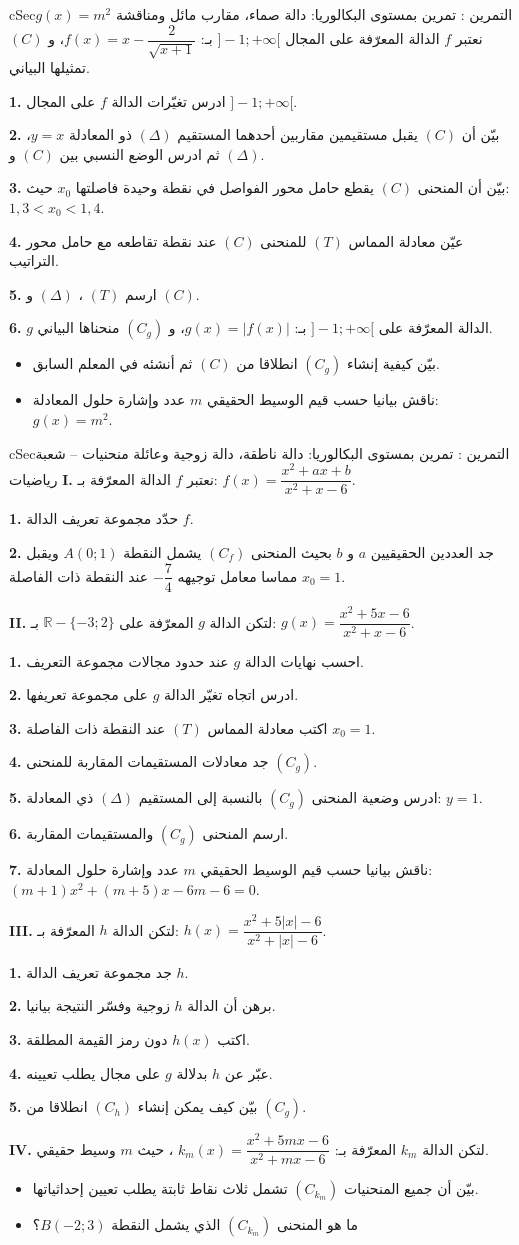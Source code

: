 \documentclass[12pt,a4paper]{article}
\newenvironment{BOX}[2]{\begin{otherlanguage}{english}\begin{arbox}{#1}{#2}}{\end{arbox}\end{otherlanguage}}
\newcounter{exo}
\newenvironment{tamrin}[1]{\stepcounter{exo}\begin{BOX}{cSec}{التمرين \theexo: #1}}{\end{BOX}}
\newcommand{\R}{\mathbb{R}}
\newcommand{\QQ}[1]{\par\smallskip\textbf{#1.} }
\begin{document}
\begin{tamrin}{تمرين بمستوى البكالوريا: دالة صماء، مقارب مائل ومناقشة $g(x)=m^{2}$}
نعتبر $f$ الدالة المعرّفة على المجال $]-1;+\infty[$ بـ: $f(x)=x-\dfrac{2}{\sqrt{x+1}}$، و $(C)$ تمثيلها البياني.
\QQ{1} ادرس تغيّرات الدالة $f$ على المجال $]-1;+\infty[$.
\QQ{2} بيّن أن $(C)$ يقبل مستقيمين مقاربين أحدهما المستقيم $(\Delta)$ ذو المعادلة $y=x$، ثم ادرس الوضع النسبي بين $(C)$ و $(\Delta)$.
\QQ{3} بيّن أن المنحنى $(C)$ يقطع حامل محور الفواصل في نقطة وحيدة فاصلتها $x_0$ حيث: $1{,}3<x_0<1{,}4$.
\QQ{4} عيّن معادلة المماس $(T)$ للمنحنى $(C)$ عند نقطة تقاطعه مع حامل محور التراتيب.
\QQ{5} ارسم $(T)$ ، $(\Delta)$ و $(C)$.
\QQ{6} $g$ الدالة المعرّفة على $]-1;+\infty[$ بـ: $g(x)=|f(x)|$، و $(C_g)$ منحناها البياني.
\begin{itemize}[label=$\star$]
\item بيّن كيفية إنشاء $(C_g)$ انطلاقا من $(C)$ ثم أنشئه في المعلم السابق.
\item ناقش بيانيا حسب قيم الوسيط الحقيقي $m$ عدد وإشارة حلول المعادلة: $g(x)=m^{2}$.
\end{itemize}
\end{tamrin}

\begin{tamrin}{تمرين بمستوى البكالوريا: دالة ناطقة، دالة زوجية وعائلة منحنيات -- شعبة رياضيات}
\textbf{I.} نعتبر $f$ الدالة المعرّفة بـ: $f(x)=\dfrac{x^{2}+ax+b}{x^{2}+x-6}$.
\QQ{1} حدّد مجموعة تعريف الدالة $f$.
\QQ{2} جد العددين الحقيقيين $a$ و $b$ بحيث المنحنى $(C_f)$ يشمل النقطة $A(0;1)$ ويقبل مماسا معامل توجيهه $-\dfrac74$ عند النقطة ذات الفاصلة $x_0=1$.

\textbf{II.} لتكن الدالة $g$ المعرّفة على $\R-\{-3;2\}$ بـ: $g(x)=\dfrac{x^{2}+5x-6}{x^{2}+x-6}$.
\QQ{1} احسب نهايات الدالة $g$ عند حدود مجالات مجموعة التعريف.
\QQ{2} ادرس اتجاه تغيّر الدالة $g$ على مجموعة تعريفها.
\QQ{3} اكتب معادلة المماس $(T)$ عند النقطة ذات الفاصلة $x_0=1$.
\QQ{4} جد معادلات المستقيمات المقاربة للمنحنى $(C_g)$.
\QQ{5} ادرس وضعية المنحنى $(C_g)$ بالنسبة إلى المستقيم $(\Delta)$ ذي المعادلة: $y=1$.
\QQ{6} ارسم المنحنى $(C_g)$ والمستقيمات المقاربة.
\QQ{7} ناقش بيانيا حسب قيم الوسيط الحقيقي $m$ عدد وإشارة حلول المعادلة: \ $(m+1)x^{2}+(m+5)x-6m-6=0$.

\textbf{III.} لتكن الدالة $h$ المعرّفة بـ: $h(x)=\dfrac{x^{2}+5|x|-6}{x^{2}+|x|-6}$.
\QQ{1} جد مجموعة تعريف الدالة $h$.
\QQ{2} برهن أن الدالة $h$ زوجية وفسّر النتيجة بيانيا.
\QQ{3} اكتب $h(x)$ دون رمز القيمة المطلقة.
\QQ{4} عبّر عن $h$ بدلالة $g$ على مجال يطلب تعيينه.
\QQ{5} بيّن كيف يمكن إنشاء $(C_h)$ انطلاقا من $(C_g)$.

\textbf{IV.} لتكن الدالة $k_m$ المعرّفة بـ: $k_m(x)=\dfrac{x^{2}+5mx-6}{x^{2}+mx-6}$ ، حيث $m$ وسيط حقيقي.
\begin{itemize}[label=$\star$]
\item بيّن أن جميع المنحنيات $(C_{k_m})$ تشمل ثلاث نقاط ثابتة يطلب تعيين إحداثياتها.
\item ما هو المنحنى $(C_{k_m})$ الذي يشمل النقطة $B(-2;3)$؟
\end{itemize}
\end{tamrin}
\end{document}

